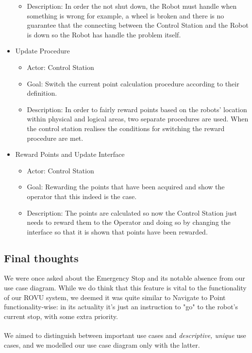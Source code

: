 \begin{itemize}
\begin{itemize}
    \item Description: In order the not shut down, the Robot must handle when something is wrong for example, a wheel is broken and there is no guarantee that the connecting between the Control Station and the Robot is down so the Robot has handle the problem itself.
\end{itemize}
\item Update Procedure
\begin{itemize}
    \item Actor: Control Station
    \item Goal: Switch the current point calculation procedure according to their definition.
    \item Description: In order to fairly reward points based on the robots' location within physical and logical areas, two separate procedures are used. When the control station realises the conditions for switching the reward procedure are met.
\end{itemize}
\item Reward Points and Update Interface
\begin{itemize}
    \item Actor: Control Station
    \item Goal: Rewarding the points that have been acquired and show the operator that this indeed is the case. 
    \item Description: The points are calculated so now the Control Station just needs to reward them to the Operator and doing so by changing the interface so that it is shown that points have been rewarded.
\end{itemize}
\end{itemize}

\subsection{Final thoughts}
We were once asked about the Emergency Stop and its notable absence from our use case diagram. While we do think that this feature is vital to the functionality of our ROVU system, we deemed it was quite similar to Navigate to Point functionality-wise: in its actuality it's just an instruction to "go" to the robot's current stop, with some extra priority. 
\\ \\
We aimed to distinguish between important use cases and \textit{descriptive, unique} use cases, and we modelled our use case diagram only with the latter.